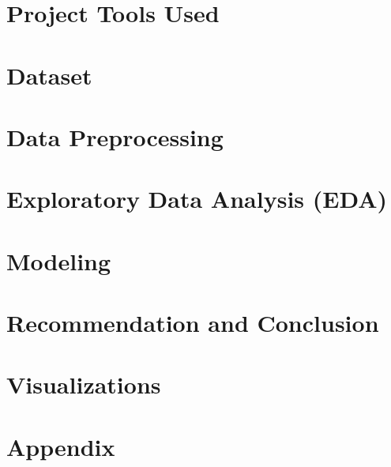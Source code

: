 \documentclass[english,12pt,twoside,a4paper]{report}
\begin{document}
	\pagestyle{empty}
	
	
	
	\clearpage
	
	\pagestyle{fancy}
	\chapter{Project Tools Used}
	
	\setcounter{page}{1}
	
	\chapter{Dataset}
	
	
	\chapter{Data Preprocessing}
	
	
	\chapter{Exploratory Data Analysis (EDA)}
	
	
	\chapter{Modeling}
	
	
	\chapter{Recommendation and Conclusion}
	
		
	\chapter{Visualizations}
	
	
	
	\appendix
	\chapter*{Appendix}
	
	
	
	
	
	
	
	
		
	
	
\end{document}
